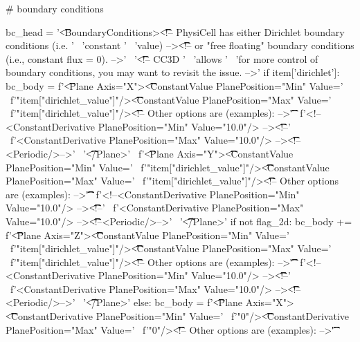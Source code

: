 \begin{python}
        # boundary conditions

        bc_head = '\t\t\t<BoundaryConditions>\n\t\t\t\t<!-- PhysiCell has either Dirichlet boundary conditions (i.e. ' \
                  'constant ' \
                  'value) -->\n\t\t\t\t<!-- or "free floating" boundary conditions (i.e., constant flux = 0). -->' \
                  '\n\t\t\t\t<!-- CC3D ' \
                  'allows ' \
                  'for more control of boundary conditions, you may want to revisit the issue. -->\n'
        if item['dirichlet']:
            bc_body = f'\t\t\t\t<Plane Axis="X">\n\t\t\t\t\t<ConstantValue PlanePosition="Min" Value=' \
                      f'"{item["dirichlet_value"]}"/>\n\t\t\t\t\t<ConstantValue PlanePosition="Max" Value=' \
                      f'"{item["dirichlet_value"]}"/>\n\t\t\t\t\t<!-- Other options are (examples): -->\n\t\t\t\t\t' \
                      f'<!--<ConstantDerivative PlanePosition="Min" Value="10.0"/> -->\n\t\t\t\t\t<!--' \
                      f'<ConstantDerivative PlanePosition="Max" Value="10.0"/> -->\n\t\t\t\t\t<!--<Periodic/>-->' \
                      '\t\t\t\t</Plane>\n' \
                      f'\t\t\t\t<Plane Axis="Y">\n\t\t\t\t\t<ConstantValue PlanePosition="Min" Value=' \
                      f'"{item["dirichlet_value"]}"/>\n\t\t\t\t\t<ConstantValue PlanePosition="Max" Value=' \
                      f'"{item["dirichlet_value"]}"/>\n\t\t\t\t\t<!-- Other options are (examples): -->\n\t\t\t\t\t' \
                      f'<!--<ConstantDerivative PlanePosition="Min" Value="10.0"/> -->\n\t\t\t\t\t<!--' \
                      f'<ConstantDerivative PlanePosition="Max" Value="10.0"/> -->\n\t\t\t\t\t<!--<Periodic/>-->' \
                      '\n\t\t\t\t</Plane>\n'
            if not flag_2d:
                bc_body += f'\t\t\t\t<Plane Axis="Z">\n\t\t\t\t\t<ConstantValue PlanePosition="Min" Value=' \
                   f'"{item["dirichlet_value"]}"/>\n\t\t\t\t\t<ConstantValue PlanePosition="Max" Value=' \
                   f'"{item["dirichlet_value"]}"/>\n\t\t\t\t\t<!-- Other options are (examples): -->\n\t\t\t\t\t' \
                   f'<!--<ConstantDerivative PlanePosition="Min" Value="10.0"/> -->\n\t\t\t\t\t<!--' \
                   f'<ConstantDerivative PlanePosition="Max" Value="10.0"/> -->\n\t\t\t\t\t<!--<Periodic/>-->' \
                   '\n\t\t\t\t</Plane>\n'
        else:
            bc_body = f'\t\t\t\t<Plane Axis="X">\n\t\t\t\t\t<ConstantDerivative PlanePosition="Min" Value=' \
              f'"0"/>\n\t\t\t\t\t<ConstantDerivative PlanePosition="Max" Value=' \
              f'"0"/>\n\t\t\t\t\t<!-- Other options are (examples): -->\n\t\t\t\t\t' \

\end{python}
